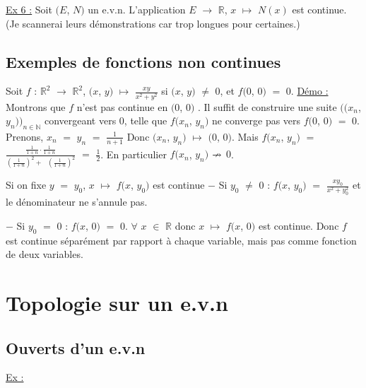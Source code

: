 \documentclass{article}
\begin{document}
\parindent=0cm
\smallbreak
\underline{Ex 6 :} \parindent=1cm \smallbreak
Soit $(E$, $N)$ un e.v.n. L'application $E$ $\longrightarrow$ $\mathbb{R}$, $x$ $\mapsto$ $N(x)$ est continue.
\smallbreak
(Je scannerai leurs démonstrations car trop longues pour certaines.)
\smallbreak

\subsection{Exemples de fonctions non continues}

Soit $f$ : $\mathbb{R}^2$ $\longrightarrow$ $\mathbb{R}^2$, $(x$, $y)$ $\mapsto$ $\frac{xy}{x^2+y^2}$ si $(x$, $y)$ $\neq$ $0$, et $f(0$, $0)$ $=$ $0$. 
\parindent=0cm
\smallbreak
\underline{Démo :} \parindent=1cm \smallbreak
Montrons que $f$ n'est pas continue en $(0$, $0)$ \smallbreak. Il suffit de construire une suite $((x_n$, $y_n))_{n \in \mathbb{N}}$ convergeant vers $0$, telle que $f(x_n$, $y_n)$ ne converge pas \smallbreak vers $f(0$, $0)$ $=$ $0$. Prenons, $x_n$ $=$
$y_n$ $=$ $\frac{1}{n+1}$ Donc  $(x_n$, $y_n)$ $\mapsto$ $(0$, $0)$. Mais \smallbreak
$f(x_n$, $y_n)$ $=$ $\frac{\frac{1}{1+n} \cdot \frac{1}{1+n}}{\left( \frac{1}{1+n} \right)^2 + \text{ } \left( \frac{1}{1+n} \right)^2}$ $=$ $\frac{1}{2}$. En particulier $f(x_n$, $y_n)$ ${\Huge \nrightarrow}$ $0$. 


Si on fixe $y$ $=$ $y_0$, $x$ $\mapsto$ $f(x$, $y_0)$ est continue \smallbreak 
$-$ Si $y_0$ $\neq$ $0$ : $f(x$, $y_0)$ $=$ $\frac{xy_0}{x^2+y_0^2}$ et le dénominateur ne s'annule pas.

$-$ Si $y_0$ $=$ $0$ : $f(x$, $0)$ $=$ $0$. $\forall$ $x$ $\in$ $\mathbb{R}$ donc $x$ $\mapsto$ $f(x$, $0)$ est continue.
\smallbreak
Donc $f$ est continue séparément par rapport à chaque variable, mais pas comme fonction de deux variables.

\section{Topologie sur un e.v.n}
\subsection{Ouverts d'un e.v.n}

\parindent=0cm
\parindent=0cm
\smallbreak
\underline{Ex :} \parindent=1cm \smallbreak
\end{document}
